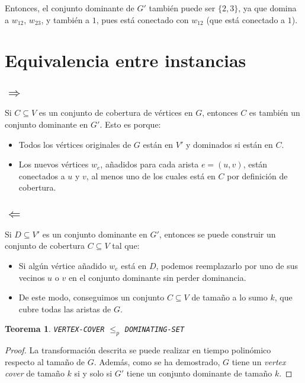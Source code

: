 \documentclass[a4paper,12pt]{article}
\newtheorem{theorem}{Teorema}
\begin{document}
Entonces, el conjunto dominante de \( G' \) también puede ser \( \{2,3\} \), ya que domina a \( w_{12} \), \( w_{23} \), y también a \( 1 \), pues está conectado con \( w_{12} \) (que está conectado a \( 1 \)).

\section{Equivalencia entre instancias}
\subsection*{\( \Rightarrow \)}
Si \( C \subseteq V \) es un conjunto de cobertura de vértices en \( G \), entonces \( C \) es también un conjunto dominante en \( G' \). Esto es porque:
\begin{itemize}
    \item Todos los vértices originales de \( G \) están en \( V' \) y dominados si están en \( C \).
    \item Los nuevos vértices \( w_e \), añadidos para cada arista \( e = (u, v) \), están conectados a \( u \) y \( v \), al menos uno de los cuales está en \( C \) por definición de cobertura.
\end{itemize}

\subsection*{\( \Leftarrow \)}
Si \( D \subseteq V' \) es un conjunto dominante en \( G' \), entonces se puede construir un conjunto de cobertura \( C \subseteq V \) tal que:
\begin{itemize}
    \item Si algún vértice añadido \( w_e \) está en \( D \), podemos reemplazarlo por uno de sus vecinos \( u \) o \( v \) en el conjunto dominante sin perder dominancia.
    \item De este modo, conseguimos un conjunto \( C \subseteq V \) de tamaño a lo sumo \( k \), que cubre todas las aristas de \( G \).
\end{itemize}

\begin{theorem}
\texttt{VERTEX-COVER} \( \leq_p \) \texttt{DOMINATING-SET}
\end{theorem}

\begin{proof}
La transformación descrita se puede realizar en tiempo polinómico respecto al tamaño de \( G \). Además, como se ha demostrado, \( G \) tiene un \textit{vertex cover} de tamaño \( k \) si y solo si \( G' \) tiene un conjunto dominante de tamaño \( k \).
\end{proof}
\end{document}
